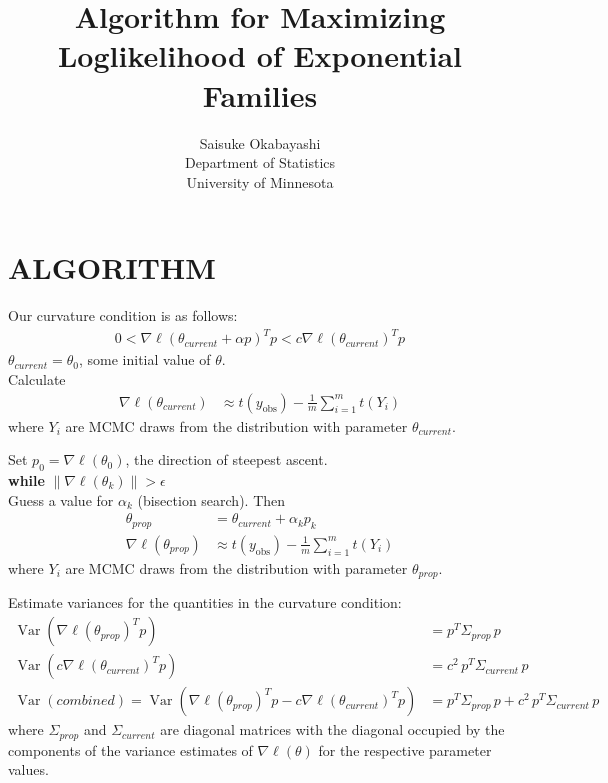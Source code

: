 \documentclass{amsbook}
\title{Algorithm for Maximizing Loglikelihood of Exponential Families}
\author{Saisuke Okabayashi \\ Department of Statistics \\ University of Minnesota}
\DeclareMathOperator{\Var}{Var}
\newcommand{\yobs}{y_{\textrm{obs}}}
\theoremstyle{definition}
\theoremstyle{remark}
\begin{document}
\maketitle

\section{ALGORITHM} 
Our curvature condition is as follows:
\begin{align*}
	0 < \nabla \ell( \theta_{current} + \alpha p ) ^T p < c \nabla \ell( \theta_
{current}) ^T p
\end{align*}
$\theta_{current} = \theta_0$, some initial value of $\theta$.\\ 
Calculate
\begin{align*}
	\nabla \ell( \theta_{current} ) &\approx t( \yobs) - \frac{1}{m} \sum_{i=1}^m t
( Y_i)
\end{align*}
where $Y_i$ are MCMC draws from the distribution with parameter $\theta_{current}$.

\noindent Set $p_0 = \nabla \ell( \theta_0)$, the direction of steepest ascent. \\

\noindent \textbf{while}  $\parallel \nabla \ell( \theta_k) \parallel > \epsilon$ \\ 
\hspace{4mm} 
\indent Guess a value for $\alpha_k$ (bisection search).  Then
\begin{align*}
	\theta_{prop} &= \theta_{current} + \alpha_k p_k \\
	\nabla \ell( \theta_{prop} ) &\approx t( \yobs) - \frac{1}{m} \sum_{i=1}^m t
( Y_i)
\end{align*}
\indent where $Y_i$ are MCMC draws from the distribution with parameter $\theta_
{prop}$.

\indent Estimate variances for the quantities in the curvature condition:
\begin{align*}
	\Var \left( \nabla \ell(\theta_{prop})^T p \right ) &= p^T \Sigma_{prop} \, p \\
	\Var \left( c \nabla \ell(\theta_{current})^T p \right ) &= c^2 \,p^T \Sigma_
{current} \, p \\
	\Var(combined) = \Var \left( \nabla \ell(\theta_{prop})^T p - c \nabla \ell
(\theta_{current})^T p \right ) &=  p^T \Sigma_{prop} \, p + c^2 \, p^T \Sigma_
{current} \, p 
\end{align*}
where $\Sigma_{prop}$ and $\Sigma_{current}$ are diagonal matrices with the diagonal 
occupied by the components of the variance estimates of $\nabla \ell(\theta )$ for 
the respective parameter values. \\
\end{document}
